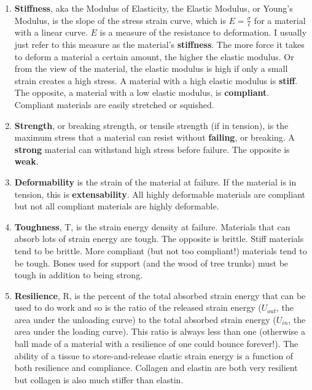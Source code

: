 \documentclass[]{book}
\providecommand{\tightlist}{%
  \setlength{\itemsep}{0pt}\setlength{\parskip}{0pt}}
\begin{document}
\begin{enumerate}
\def\labelenumi{\arabic{enumi}.}
\tightlist
\item
  \textbf{Stiffness}, aka the Modulus of Elasticity, the Elastic
  Modulus, or Young's Modulus, is the slope of the stress strain curve,
  which is \(E = \frac{\sigma}{\epsilon}\) for a material with a linear
  curve. \(E\) is a measure of the resistance to deformation. I usually
  just refer to this measure as the material's \textbf{stiffness}. The
  more force it takes to deform a material a certain amount, the higher
  the elastic modulus. Or from the view of the material, the elastic
  modulus is high if only a small strain creates a high stress. A
  material with a high elastic modulus is \textbf{stiff}. The opposite,
  a material with a low elastic modulus, is \textbf{compliant}.
  Compliant materials are easily stretched or squished.
\item
  \textbf{Strength}, or breaking strength, or tensile strength (if in
  tension), is the maximum stress that a material can resist without
  \textbf{failing}, or breaking. A \textbf{strong} material can
  withstand high stress before failure. The opposite is \textbf{weak}.
\item
  \textbf{Deformability} is the strain of the material at failure. If
  the material is in tension, this is \textbf{extensability}. All highly
  deformable materials are compliant but not all compliant materials are
  highly deformable.
\item
  \textbf{Toughness}, T, is the strain energy density at failure.
  Materials that can absorb lots of strain energy are tough. The
  opposite is brittle. Stiff materials tend to be brittle. More
  compliant (but not too compliant!) materials tend to be tough. Bones
  used for support (and the wood of tree trunks) must be tough in
  addition to being strong.
\item
  \textbf{Resilience}, R, is the percent of the total absorbed strain
  energy that can be used to do work and so is the ratio of the released
  strain energy (\(U_{out}\), the area under the unloading curve) to the
  total absorbed strain energy (\(U_{in}\), the area under the loading
  curve). This ratio is always less than one (otherwise a ball made of a
  material with a resilience of one could bounce forever!). The ability
  of a tissue to store-and-release elastic strain energy is a function
  of both resilience and compliance. Collagen and elastin are both very
  resilient but collagen is also much stiffer than elastin.
\end{enumerate}
\end{document}
